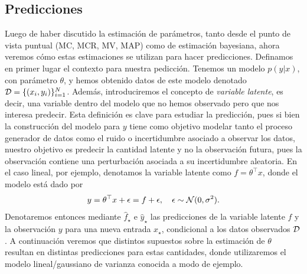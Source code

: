 \subsection{Predicciones} %
\label{sub:predicciones}

Luego de haber discutido la estimación de parámetros, tanto desde el punto de vista puntual (MC, MCR, MV, MAP) como de estimación bayesiana, ahora veremos cómo estas estimaciones se utilizan para hacer predicciones. Definamos en primer lugar el contexto para nuestra pedicción. Tenemos un modelo $p(y|x)$, con parámetro $\theta$, y hemos obtenido datos de este modelo denotado ${\mathcal D} = \{(x_i,y_i)\}_{i=1}^N$. Además, introduciremos el concepto de \emph{variable latente}, es decir, una variable dentro del modelo que no hemos observado pero que nos interesa predecir. Esta definición es clave para estudiar la predicción, pues si bien la construcción del modelo para $y$ tiene como objetivo modelar tanto el proceso generador de datos como el ruido o incertidumbre asociado a observar los datos, nuestro objetivo es predecir la cantidad latente y no la observación futura, pues la observación contiene una perturbación asociada a su incertidumbre aleatoria. En el caso lineal, por ejemplo, denotamos la variable latente como $f = \theta^\top x$, donde el modelo está dado por
\begin{equation}
		 y = \theta^\top x  + \epsilon = f + \epsilon, \quad \epsilon \sim {\mathcal N}(0,\sigma^2).
\end{equation}
Denotaremos entonces mediante $\hat f_\star$ e $\hat y_\star$ las predicciones de la variable latente $f$ y la observación $y$ para una nueva entrada $x_\star$, condicional a los datos observados ${\mathcal D}$. A continuación veremos que distintos supuestos sobre la estimación de $\theta$ resultan en distintas predicciones para estas cantidades, donde utilizaremos el modelo lineal/gaussiano de varianza conocida a modo de ejemplo. 

